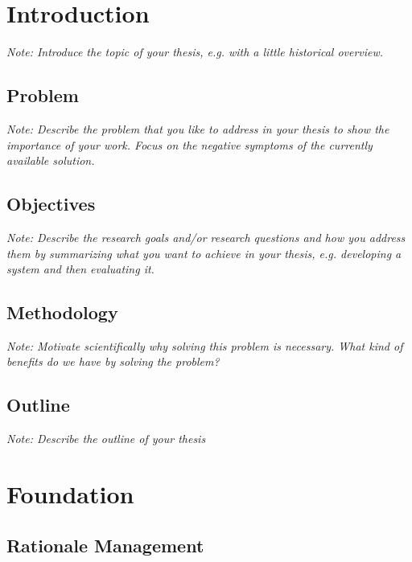 \documentclass[a4paper,12pt,twoside]{report}
\begin{document}

\chapter{Introduction}

\textit{Note: Introduce the topic of your thesis, e.g. with a little historical overview.}

\section{Problem}

\textit{Note: Describe the problem that you like to address in your thesis to show the importance of your work. Focus on the negative symptoms of the currently available solution.}

\section{Objectives}

\textit{Note: Describe the research goals and/or research questions and how you address them by summarizing what you want to achieve in your thesis, e.g. developing a system and then evaluating it.}

\section{Methodology}

\textit{Note: Motivate scientifically why solving this problem is necessary. What kind of benefits do we have by solving the problem?}

\section{Outline}

\textit{Note: Describe the outline of your thesis}




\chapter{Foundation}

\section{Rationale Management}
\end{document}
